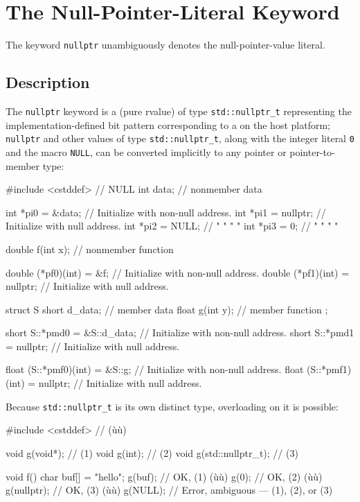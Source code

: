 \newpage
\section[{\tt nullptr}]{The Null-Pointer-Literal Keyword}\label{null-pointer-literal-(nullptr)}

The keyword \lstinline!nullptr! unambiguously denotes the
null-pointer-value literal.

\subsection[Description]{Description}\label{description}

The \lstinline!nullptr! keyword is a  (pure rvalue) of type
\lstinline!std::nullptr_t! representing the implementation-defined
bit pattern corresponding to a  on the host platform;
\lstinline!nullptr! and other values of type \lstinline!std::nullptr_t!, along with the integer literal \lstinline!0! and the macro \lstinline!NULL!, can be converted implicitly to any pointer or pointer-to-member type:

\begin{emcppslisting}
#include <cstddef> // NULL
int data;  // nonmember data

int *pi0 = &data;    // Initialize with non-null address.
int *pi1 = nullptr;  // Initialize with null address.
int *pi2 = NULL;     //  "          "    "    "
int *pi3 = 0;        //  "          "    "    "

double f(int x);  // nonmember function

double (*pf0)(int) = &f;       // Initialize with non-null address.
double (*pf1)(int) = nullptr;  // Initialize with null address.

struct S
{
    short d_data;    // member data
    float g(int y);  // member function
};

short S::*pmd0 = &S::d_data;  // Initialize with non-null address.
short S::*pmd1 = nullptr;     // Initialize with null address.

float (S::*pmf0)(int) = &S::g;    // Initialize with non-null address.
float (S::*pmf1)(int) = nullptr;  // Initialize with null address.
\end{emcppslisting}


\noindent Because \lstinline!std::nullptr_t! is its own distinct type, overloading on
it is possible:

\begin{emcppslisting}
#include <cstddef>  // (ù{}ù)

void g(void*);           // (1)
void g(int);             // (2)
void g(std::nullptr_t);  // (3)

void f()
{
    char buf[] = "hello";
    g(buf);      // OK, (1) (ù{}ù)
    g(0);        // OK, (2) (ù{}ù)
    g(nullptr);  // OK, (3) (ù{}ù)
    g(NULL);     // Error, ambiguous --- (1), (2), or (3)
}
\end{emcppslisting}


